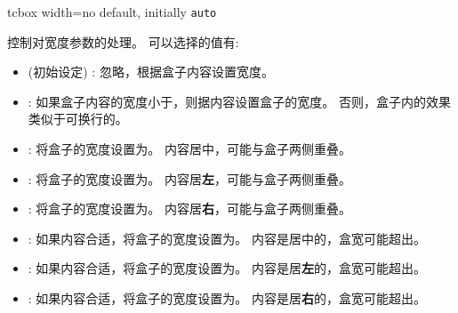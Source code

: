 \begin{docTcbKey}[][doc new=2015-03-23]{tcbox width}{=}{no default, initially \texttt{auto}}
  
  控制对宽度参数的处理。%
  可以选择的值有:
  \begin{itemize}
  \item{} 
  (初始设定) :
  忽略，根据盒子内容设置宽度。
  \item{}:
  如果盒子内容的宽度小于，则据内容设置盒子的宽度。%
  否则，盒子内的效果类似于可换行的。
  \item{}:
  将盒子的宽度设置为。%
  内容居中，可能与盒子两侧重叠。
  \item{}:
  将盒子的宽度设置为。%
  内容居{\bf 左}，可能与盒子两侧重叠。
  \item{}:
  将盒子的宽度设置为。%
  内容居{\bf 右}，可能与盒子两侧重叠。
  \item{}:
  如果内容合适，将盒子的宽度设置为。%
  内容是居中的，盒宽可能超出。
  \item{}:
  如果内容合适，将盒子的宽度设置为。%
  内容是居{\bf 左}的，盒宽可能超出。
  \item{}:
  如果内容合适，将盒子的宽度设置为。%
  内容是居{\bf 右}的，盒宽可能超出。
  \end{itemize}


\end{docTcbKey}
